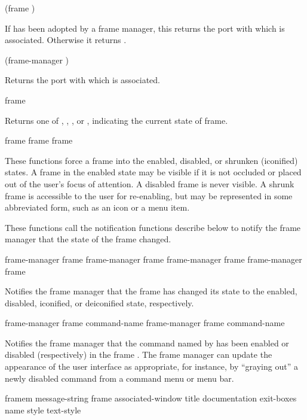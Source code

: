  {(frame )}

If  has been adopted by a frame manager, this returns the port with
which  is associated.  Otherwise it returns .

 {(frame-manager )}

Returns the port with which  is associated.

 {frame}

Returns one of , , , or ,
indicating the current state of frame.

 {frame}
 {frame}
 {frame}

These functions force a frame into the enabled, disabled, or shrunken
(iconified) states.  A frame in the enabled state may be visible if it is not
occluded or placed out of the user's focus of attention.  A disabled frame is
never visible.  A shrunk frame is accessible to the user for re-enabling, but
may be represented in some abbreviated form, such as an icon or a menu item.

These functions call the notification functions describe below to notify the
frame manager that the state of the frame changed.

 {frame-manager frame}
 {frame-manager frame}
 {frame-manager frame}
 {frame-manager frame}

Notifies the frame manager  that the frame  has
changed its state to the enabled, disabled, iconified, or deiconified state,
respectively.


 {frame-manager frame command-name}
 {frame-manager frame command-name}

Notifies the frame manager  that the command named by
 has been enabled or disabled (respectively) in the frame
.  The frame manager can update the appearance of the user interface
as appropriate, for instance, by ``graying out'' a newly disabled command from a
command menu or menu bar.


 {framem message-string
                                         \key frame associated-window title documentation
                                              exit-boxes name style text-style}

